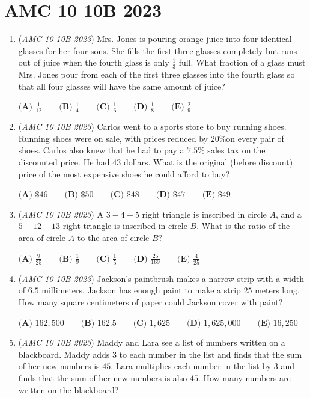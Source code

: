 \section{AMC 10 10B 2023}
        \begin{enumerate}
        	\item (\textit{AMC 10 10B 2023}) Mrs. Jones is pouring orange juice into four identical glasses for her four sons. She fills the first three glasses completely but runs out of juice when the fourth glass is only $\frac{1}{3}$ full. What fraction of a glass must Mrs. Jones pour from each of the first three glasses into the fourth glass so that all four glasses will have the same amount of juice?


 $\textbf{(A) }\frac{1}{12}\qquad\textbf{(B) }\frac{1}{4}\qquad\textbf{(C) }\frac{1}{6}\qquad\textbf{(D) }\frac{1}{8}\qquad\textbf{(E) }\frac{2}{9}$


	\item (\textit{AMC 10 10B 2023}) Carlos went to a sports store to buy running shoes. Running shoes were on sale, with prices reduced by $20\%$on every pair of shoes. Carlos also knew that he had to pay a $7.5\%$ sales tax on the discounted price. He had $43$ dollars. What is the original (before discount) price of the most expensive shoes he could afford to buy?


 $\textbf{(A) }\$46\qquad\textbf{(B) }\$50\qquad\textbf{(C) }\$48\qquad\textbf{(D) }\$47\qquad\textbf{(E) }\$49$


	\item (\textit{AMC 10 10B 2023}) A $3-4-5$ right triangle is inscribed in circle $A$, and a $5-12-13$ right triangle is inscribed in circle $B$. What is the ratio of the area of circle $A$ to the area of circle $B$?


 $\textbf{(A) }\frac{9}{25}\qquad\textbf{(B) }\frac{1}{9}\qquad\textbf{(C) }\frac{1 }{5}\qquad\textbf{(D) }\frac{25}{169}\qquad\textbf{(E) }\frac{4}{25}$


	\item (\textit{AMC 10 10B 2023}) Jackson's paintbrush makes a narrow strip with a width of $6.5$ millimeters. Jackson has enough paint to make a strip $25$ meters long. How many square centimeters of paper could Jackson cover with paint?


 $\textbf{(A) }162{,}500\qquad\textbf{(B) }162.5\qquad\textbf{(C) }1{,}625\qquad\textbf{(D) }1{,}625{,}000\qquad\textbf{(E) }16{,}250$


	\item (\textit{AMC 10 10B 2023}) Maddy and Lara see a list of numbers written on a blackboard. Maddy adds $3$ to each number in the list and finds that the sum of her new numbers is $45$. Lara multiplies each number in the list by $3$ and finds that the sum of her new numbers is also $45$. How many numbers are written on the blackboard?



\end{enumerate}
